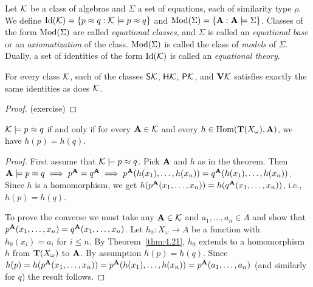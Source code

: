 \documentclass[11pt]{amsart}  %
\begin{document}
\begin{definition} Let $\mathcal{K}$ be a class of algebras and $\Sigma$ a set of equations, each 
of similarity type $\rho$. We define 
$\operatorname{Id}(\mathcal{K}) = \{p \approx q : \mathcal{K} \models p \approx q\}$ 
and
$\operatorname{Mod}(\Sigma) = \{ \mathbf{A} : \mathbf{A} \models \Sigma \}$.
Classes of the form $\operatorname{Mod}(\Sigma)$ are called \emph{equational classes}, and $\Sigma$ is called 
an \emph{equational base} or an \emph{axiomatization} of the class. $\operatorname{Mod}(\Sigma)$ is called the 
class of \emph{models} of $\Sigma$. Dually, a set of identities of the form $\operatorname{Id}(\mathcal{K})$ is called an 
\emph{equational theory}.
\end{definition}

\begin{lemma} 
  \label{lem:4.36} 
  For every class $\mathcal{K}$, each of the classes $\mathsf{S} \mathcal{K}$, 
  $\mathsf{H} \mathcal{K}$, $\mathsf{P} \mathcal{K}$, and $\mathbf{V} \mathcal{K}$ satisfies 
  exactly the same identities as does $\mathcal{K}$.
\end{lemma}
\begin{proof} (exercise) \end{proof}


\begin{lemma}
  \label{lem:4.37} 
  $\mathcal{K} \models p \approx q$ 
  if  and  only  if  for  every  $\mathbf{A} \in \mathcal{K}$  and  every  
  $h\in \operatorname{Hom}(\mathbf{T}(X_\omega),\mathbf{A})$,  we  have  $h(p)  =  h(q)$.
\end{lemma} 
\begin{proof} First  assume  that  $\mathcal{K} \models p\approx  q$.  
  Pick  $\mathbf{A}$ and $h$ as  in  the  theorem.  Then
  $\mathbf{A} \models p\approx q \implies p^{\mathbf{A}} = q^{\mathbf{A}} \implies 
  p^{\mathbf{A}}(h(x_1), \dots, h(x_n)) = q^{\mathbf{A}}(h(x_1), \dots, h(x_n))$.
  Since  $h$  is  a  homomorphism,  we  get  
  $h(p^{\mathbf{A}}(x_1, \dots, x_n)) = h(q^{\mathbf{A}}(x_1, \dots, x_n))$, i.e., $h(p) = h(q)$.

  To  prove  the  converse  we  must  take  any  $\mathbf{A} \in \mathcal{K}$  and  
  $a_1, \dots, a_n \in A$ and show that $p^{\mathbf{A}}(x_1, \dots, x_n) = q^{\mathbf{A}}(x_1, \dots, x_n)$.
  Let $h_0 \colon X_\omega \to A$ be a function with $h_0(x_i) = a_i$ for $i\leq n$.
  By  Theorem~\ref{thm:4.21},  $h_0$ extends  to  a homomorphism  $h$ from $\mathbf{T}(X_\omega)$
  to $\mathbf{A}$.  By  assumption  $h(p)  =  h(q)$.  Since 
  $h(p)  =  h(p^{\mathbf{A}}(x_1, \dots, x_n)) = 
  p^{\mathbf{A}}(h(x_1), \dots, h(x_n)) =  p^{\mathbf{A}}(a_1,\dots, a_n)$ 
  (and  similarly  for  $q$)  the  result  follows. 
\end{proof}
\end{document}
